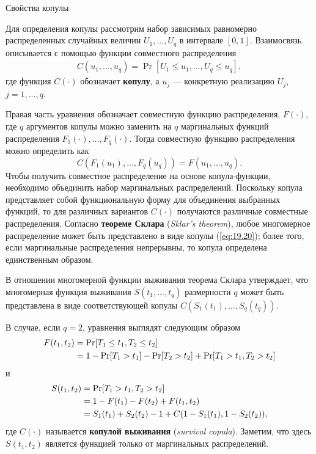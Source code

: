         \begin{center}Свойства копулы\end{center}
        \noindent
Для определения копулы рассмотрим набор зависимых равномерно распределенных случайных величин $U_1, ..., U_q$ в интервале $[0, 1]$. Взаимосвязь описывается с помощью функции совместного распределения
    \begin{align}\label{eq:19.20}
    C(u_1, ... , u_q) = \Pr[U_1 \le u_1, ... , U_q \le u_q],
    \end{align}
где функция $C(\cdot)$ обозначает \textbf{копулу}, а $u_j$ --- конкретную реализацию $U_j$, $j = 1, ..., q$.

Правая часть уравнения обозначает совместную функцию распределения, $F(\cdot)$, где $q$ аргументов копулы можно заменить на $q$ маргинальных функций распределения $F_1(\cdot), ..., F_q(\cdot)$. Тогда совместную функцию распределения можно определить как
    $$C(F_1(u_1), ... , F_q(u_q)) = F(u_1, ..., u_q).$$
Чтобы получить совместное распределение на основе копула-функции, необходимо объединить набор маргинальных распределений. Поскольку копула представляет собой функциональную форму для объединения выбранных функций, то для различных вариантов $C(\cdot)$ получаются различные совместные распределения. Согласно \textbf{теореме Склара} (\textit{Sklar's theorem}), любое многомерное распределение может быть представлено в виде копулы (\ref{eq:19.20}); более того, если маргинальные распределения непрерывны, то копула определена единственным образом.

В отношении многомерной функции выживания теорема Склара утверждает, что многомерная функция выживания $S(t_1, ..., t_q)$ размерности $q$ может быть представлена в виде соответствующей копулы $C(S_1(t_1), ..., S_q(t_q))$.

В случае, если $q = 2$, уравнения выглядят следующим образом
    \begin{align}
    F(t_1, t_2)     &= \Pr[T_1 \le t_1, T_2 \le t_2] \notag \\
                    &= 1 - \Pr[T_1 > t_1] - \Pr[T_2 > t_2] + \Pr[T_1>t_1, T_2>t_2] \notag
    \end{align}
и
    \begin{align}
    S(t_1, t_2)     &= \Pr[T_1>t_1, T_2>t_2] \notag \\
                    &= 1-F(t_1) - F(t_2) + F(t_1,t_2) \notag \\
                    &= S_1(t_1) + S_2(t_2) - 1 + C(1-S_1(t_1), 1 - S_2(t_2)), \notag
    \end{align}
где $C(\cdot)$ называется \textbf{копулой выживания} (\textit{survival copula}). Заметим, что здесь $S(t_1, t_2)$ является функцией только от маргинальных распределений.

